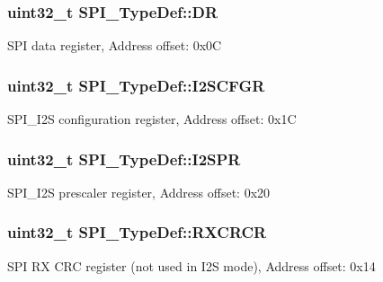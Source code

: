 \subsubsection[{\texorpdfstring{DR}{DR}}]{ uint32\+\_\+t S\+P\+I\+\_\+\+Type\+Def\+::\+DR}\hypertarget{struct_s_p_i___type_def_a02ef206dd5bb270e1f17fedd71284422}{}\label{struct_s_p_i___type_def_a02ef206dd5bb270e1f17fedd71284422}
S\+PI data register, Address offset\+: 0x0C 
\subsubsection[{\texorpdfstring{I2\+S\+C\+F\+GR}{I2SCFGR}}]{ uint32\+\_\+t S\+P\+I\+\_\+\+Type\+Def\+::\+I2\+S\+C\+F\+GR}\hypertarget{struct_s_p_i___type_def_a4a1547c0ed26f31108910c35d2876b83}{}\label{struct_s_p_i___type_def_a4a1547c0ed26f31108910c35d2876b83}
S\+P\+I\+\_\+\+I2S configuration register, Address offset\+: 0x1C 
\subsubsection[{\texorpdfstring{I2\+S\+PR}{I2SPR}}]{ uint32\+\_\+t S\+P\+I\+\_\+\+Type\+Def\+::\+I2\+S\+PR}\hypertarget{struct_s_p_i___type_def_aff2f386a2566c722f7962377b495f1a2}{}\label{struct_s_p_i___type_def_aff2f386a2566c722f7962377b495f1a2}
S\+P\+I\+\_\+\+I2S prescaler register, Address offset\+: 0x20 
\subsubsection[{\texorpdfstring{R\+X\+C\+R\+CR}{RXCRCR}}]{ uint32\+\_\+t S\+P\+I\+\_\+\+Type\+Def\+::\+R\+X\+C\+R\+CR}\hypertarget{struct_s_p_i___type_def_a60f1f0e77c52e89cfd738999bee5c9d0}{}\label{struct_s_p_i___type_def_a60f1f0e77c52e89cfd738999bee5c9d0}
S\+PI RX C\+RC register (not used in I2S mode), Address offset\+: 0x14 
